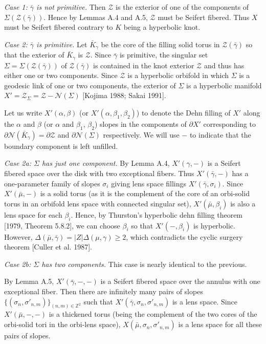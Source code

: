 \documentclass[11pt]{article}
\newcommand{\Zs}{\ensuremath{\mathcal{Z}}}   %
\newcommand{\Ns}{\ensuremath{\mathcal{N}}}   %
\begin{document}
\textit{Case 1: $\bar\gamma$ is not primitive.} Then $\Zs$ is the exterior of one of the
components of $\Sigma(\Zs(\bar\gamma))$. Hence by Lemmas A.4 and A.5, $\Zs$ must be Seifert
fibered. Thus $X$ must be Seifert fibered contrary to $K$ being a hyperbolic knot.

\textit{Case 2: $\bar\gamma$ is primitive.} Let $\bar K_\gamma$ be the core of the filling solid
torus in $\Zs(\bar\gamma)$ so that the exterior of $\bar K_\gamma$ is $\Zs$. Since $\bar\gamma$
is primitive, the singular set $\Sigma = \Sigma(\Zs(\bar\gamma))$ of $\Zs(\bar\gamma)$ is contained
in the knot exterior $\Zs$ and thus has either one or two components. Since $\Zs$ is a hyperbolic
orbifold in which $\Sigma$ is a geodesic link of one or two components, the exterior of $\Sigma$
is a hyperbolic manifold $X' = \Zs_\Sigma = \Zs - \Ns(\Sigma)$ [Kojima 1988; Sakai 1991].

Let us write $X'(\alpha,\beta)$ (or $X'(\alpha,\beta_1,\beta_2)$) to denote the Dehn filling of
$X'$ along the $\alpha$ and $\beta$ (or $\alpha$ and $\beta_1$, $\beta_2$) slopes in the components
of $\partial X'$ corresponding to $\partial\Ns(\bar K_\gamma) = \partial\Zs$ and
$\partial\Ns(\Sigma)$ respectively. We will use $-$ to indicate that the boundary component is
left unfilled.

\textit{Case 2a: $\Sigma$ has just one component.} By Lemma A.4, $X'(\gamma,-)$
is a Seifert fibered space over the disk with two exceptional fibers. Thus $X'(\bar\gamma,-)$ has
a one-parameter family of slopes $\sigma_i$ giving lens space fillings $X'(\bar\gamma,\sigma_i)$.
Since $X'(\bar\mu,-)$ is a solid torus (as it is the complement of the core of an orbi-solid torus
in an orbifold lens space with connected singular set), $X'(\bar\mu,\beta_i)$ is also a lens space
for each $\beta_i$. Hence, by Thurston's hyperbolic dehn filling theorem [1979, Theorem 5.8.2],
we can choose $\beta_i$ so that $X'(-,\beta_i)$ is hyperbolic. However,
$\Delta(\bar\mu,\bar\gamma) = |Z|\Delta(\mu,\gamma) \ge 2$, which contradicts the cyclic surgery
theorem [Culler et al. 1987].

\textit{Case 2b: $\Sigma$ has two components.} This case is nearly identical to the previous.


By Lemma A.5, $X'(\bar\gamma,-,-)$ is a Seifert fibered space over the annulus with one exceptional
fiber. Then there are infinitely many pairs of slopes
$\{(\sigma_n,\sigma'_{n,m})\}_{(n,m)\in\mathbb{Z}^2}$ such that
$X'(\bar\gamma,\sigma_n,\sigma'_{n,m})$ is a lens space. Since $X'(\bar\mu,-,-)$ is a thickened
torus (being the complement of the two cores of the orbi-solid tori in the orbi-lens space),
$X(\bar\mu,\sigma_n,\sigma'_{n,m})$
is a lens space for all these pairs of slopes.
\end{document}
